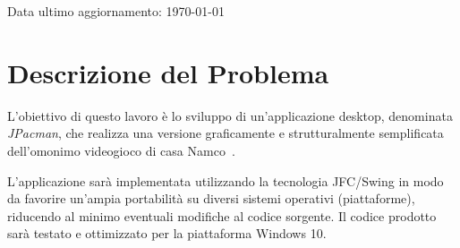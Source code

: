 \documentclass[12pt,a4paper]{report}
\begin{document}
\begin{titlepage}

	\vfill
	\raggedright
	\small{Data ultimo aggiornamento: \today}
\end{titlepage}
\restoregeometry

\tableofcontents

\chapter{Descrizione del Problema}\label{ch:despro}
L'obiettivo di questo lavoro è lo sviluppo di un'applicazione desktop, denominata \emph{JPacman}, che realizza una versione graficamente e strutturalmente semplificata dell'omonimo videogioco di casa Namco~\cite{wiki:it:pacman,wiki:it:namco}.

L'applicazione sarà implementata utilizzando la tecnologia JFC/Swing in modo da favorire un'ampia portabilità su diversi sistemi operativi (piattaforme), riducendo al minimo eventuali modifiche al codice sorgente. Il codice prodotto sarà testato e ottimizzato per la piattaforma Windows 10.

\end{document}
